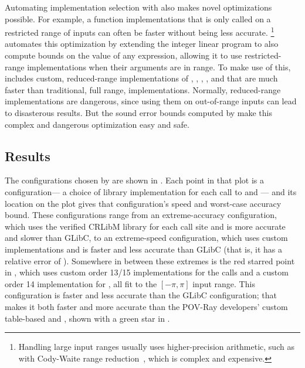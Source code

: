 \documentclass[paper.tex]{subfiles}
\begin{document}
Automating implementation selection with \name
  also makes novel optimizations possible.
For example,
  a function implementations that is only called
  on a restricted range of inputs
  can often be faster without being less accurate.%
\footnote{Handling large input ranges
  usually uses higher-precision arithmetic,
  such as with Cody-Waite range reduction~\cite{cody-waite},
  which is complex and expensive.}
\name automates this optimization
  by extending the integer linear program
  to also compute bounds on the value of any expression,
  allowing it to use restricted-range implementations
  when their arguments are in range.
To make use of this,
  \name includes custom, reduced-range implementations
  of , , , , and 
  that are much faster than traditional, full range, implementations.
Normally, reduced-range implementations are dangerous,
  since using them on out-of-range inputs can lead to disasterous results.
But the sound error bounds computed by \name
  make this complex and dangerous optimization easy and safe.

\subsection{Results}

The \nPovProgConfigs configurations chosen by \name
  are shown in .
Each point in that plot is a configuration---%
  a choice of library implementation for each call to  and ---%
  and its location on the plot gives that configuration's speed
  and worst-case accuracy bound.
These configurations range from
  an extreme-accuracy configuration,
  which uses the verified CRLibM library for each call site
  and is \nPovProgCrlibmAccuracyIncrease more accurate
  and \nPovProgCrlibmSlowdown slower than GLibC,
  to an extreme-speed configuration,
  which uses custom implementations
  and is \nPovProgFastSpeedup faster and
  \nPovProgFastAccuracyDecrease less accurate than GLibC
  (that is, it has a relative error of \nPovProgFastRelativeError).
Somewhere in between these extremes
  is the red starred point in ,
  which uses custom order 13/15 implementations for the  calls
  and a custom order 14 implementation for ,
  all fit to the $[-\pi, \pi]$ input range.
This configuration is \nPovProgLosslessSpeedup faster
  and \nPovProgLosslessAccuracyDecrease less accurate
  than the GLibC configuration;
  that makes it both faster and more accurate
  than the POV-Ray developers' custom table-based  and ,
  shown with a green star in .
\end{document}
